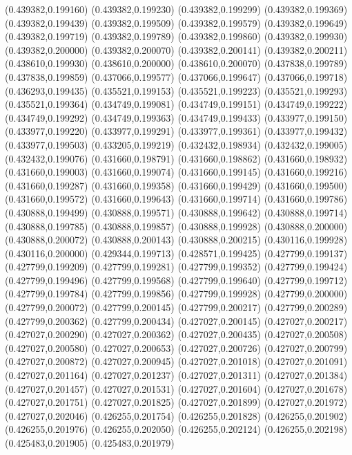 (0.439382,0.199160)
(0.439382,0.199230)
(0.439382,0.199299)
(0.439382,0.199369)
(0.439382,0.199439)
(0.439382,0.199509)
(0.439382,0.199579)
(0.439382,0.199649)
(0.439382,0.199719)
(0.439382,0.199789)
(0.439382,0.199860)
(0.439382,0.199930)
(0.439382,0.200000)
(0.439382,0.200070)
(0.439382,0.200141)
(0.439382,0.200211)
(0.438610,0.199930)
(0.438610,0.200000)
(0.438610,0.200070)
(0.437838,0.199789)
(0.437838,0.199859)
(0.437066,0.199577)
(0.437066,0.199647)
(0.437066,0.199718)
(0.436293,0.199435)
(0.435521,0.199153)
(0.435521,0.199223)
(0.435521,0.199293)
(0.435521,0.199364)
(0.434749,0.199081)
(0.434749,0.199151)
(0.434749,0.199222)
(0.434749,0.199292)
(0.434749,0.199363)
(0.434749,0.199433)
(0.433977,0.199150)
(0.433977,0.199220)
(0.433977,0.199291)
(0.433977,0.199361)
(0.433977,0.199432)
(0.433977,0.199503)
(0.433205,0.199219)
(0.432432,0.198934)
(0.432432,0.199005)
(0.432432,0.199076)
(0.431660,0.198791)
(0.431660,0.198862)
(0.431660,0.198932)
(0.431660,0.199003)
(0.431660,0.199074)
(0.431660,0.199145)
(0.431660,0.199216)
(0.431660,0.199287)
(0.431660,0.199358)
(0.431660,0.199429)
(0.431660,0.199500)
(0.431660,0.199572)
(0.431660,0.199643)
(0.431660,0.199714)
(0.431660,0.199786)
(0.430888,0.199499)
(0.430888,0.199571)
(0.430888,0.199642)
(0.430888,0.199714)
(0.430888,0.199785)
(0.430888,0.199857)
(0.430888,0.199928)
(0.430888,0.200000)
(0.430888,0.200072)
(0.430888,0.200143)
(0.430888,0.200215)
(0.430116,0.199928)
(0.430116,0.200000)
(0.429344,0.199713)
(0.428571,0.199425)
(0.427799,0.199137)
(0.427799,0.199209)
(0.427799,0.199281)
(0.427799,0.199352)
(0.427799,0.199424)
(0.427799,0.199496)
(0.427799,0.199568)
(0.427799,0.199640)
(0.427799,0.199712)
(0.427799,0.199784)
(0.427799,0.199856)
(0.427799,0.199928)
(0.427799,0.200000)
(0.427799,0.200072)
(0.427799,0.200145)
(0.427799,0.200217)
(0.427799,0.200289)
(0.427799,0.200362)
(0.427799,0.200434)
(0.427027,0.200145)
(0.427027,0.200217)
(0.427027,0.200290)
(0.427027,0.200362)
(0.427027,0.200435)
(0.427027,0.200508)
(0.427027,0.200580)
(0.427027,0.200653)
(0.427027,0.200726)
(0.427027,0.200799)
(0.427027,0.200872)
(0.427027,0.200945)
(0.427027,0.201018)
(0.427027,0.201091)
(0.427027,0.201164)
(0.427027,0.201237)
(0.427027,0.201311)
(0.427027,0.201384)
(0.427027,0.201457)
(0.427027,0.201531)
(0.427027,0.201604)
(0.427027,0.201678)
(0.427027,0.201751)
(0.427027,0.201825)
(0.427027,0.201899)
(0.427027,0.201972)
(0.427027,0.202046)
(0.426255,0.201754)
(0.426255,0.201828)
(0.426255,0.201902)
(0.426255,0.201976)
(0.426255,0.202050)
(0.426255,0.202124)
(0.426255,0.202198)
(0.425483,0.201905)
(0.425483,0.201979)
